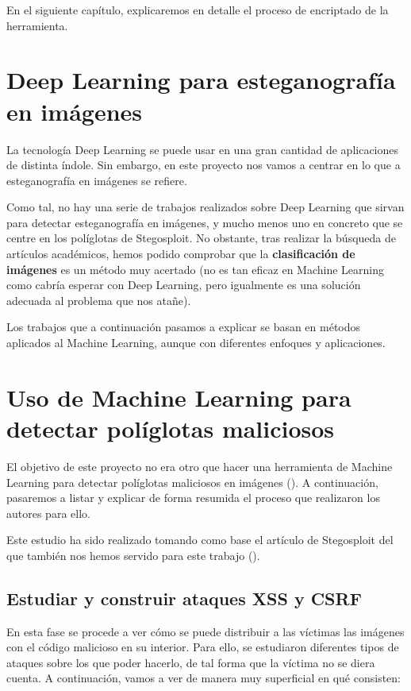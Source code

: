 En el siguiente capítulo, explicaremos en detalle el proceso de encriptado de la herramienta.

\section{Deep Learning para esteganografía en imágenes}

La tecnología Deep Learning se puede usar en una gran cantidad de aplicaciones de distinta índole. Sin embargo, en este proyecto nos vamos a centrar en lo que a esteganografía en imágenes se refiere.

Como tal, no hay una serie de trabajos realizados sobre Deep Learning que sirvan para detectar esteganografía en imágenes, y mucho menos uno en concreto que se centre en los políglotas de Stegosploit. No obstante, tras realizar la búsqueda de artículos académicos, hemos podido comprobar que la \textbf{clasificación de imágenes} es un método muy acertado (no es tan eficaz en Machine Learning como cabría esperar con Deep Learning, pero igualmente es una solución adecuada al problema que nos atañe).

Los trabajos que a continuación pasamos a explicar se basan en métodos aplicados al Machine Learning, aunque con diferentes enfoques y aplicaciones. 

\section{Uso de Machine Learning para detectar políglotas maliciosos}
\label{sec:ml}

El objetivo de este proyecto no era otro que hacer una herramienta de Machine Learning para detectar políglotas maliciosos en imágenes (\cite{ml-stenography-shawat}). A continuación, pasaremos a listar y explicar de forma resumida el proceso que realizaron los autores para ello. %

Este estudio ha sido realizado tomando como base el artículo de Stegosploit del que también nos hemos servido para este trabajo (\cite{stegosploit}). %

\subsection{Estudiar y construir ataques XSS y CSRF}

En esta fase se procede a ver cómo se puede distribuir a las víctimas las imágenes con el código malicioso en su interior. Para ello, se estudiaron diferentes tipos de ataques sobre los que poder hacerlo, de tal forma que la víctima no se diera cuenta. A continuación, vamos a ver de manera muy superficial en qué consisten:

